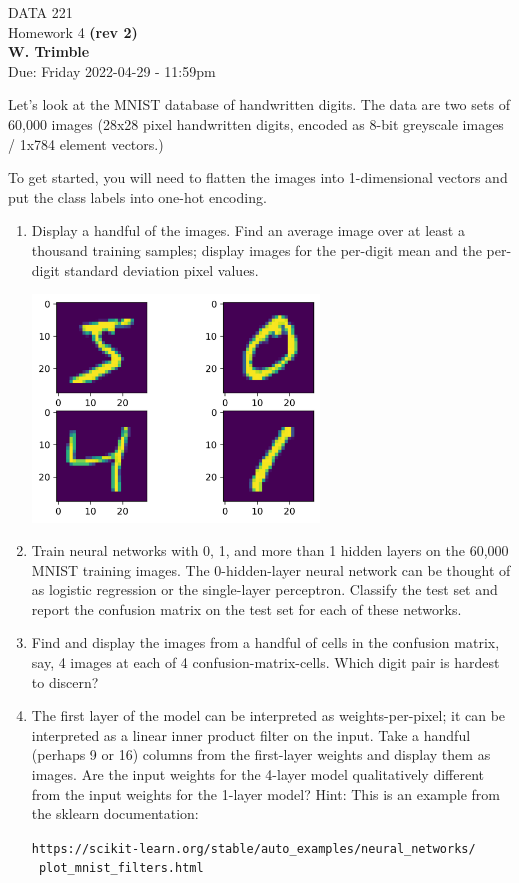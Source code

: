 \documentclass[12pt]{book}
\theoremstyle{definition}
\begin{document}
\begin{center}
{\Large DATA 221 \\  Homework 4  \textbf{(rev 2)}}\\
\textbf{W. Trimble}\\ %
Due: Friday 2022-04-29  - 11:59pm
\end{center}

\vspace{0.2 cm}

Let's look at the MNIST database of handwritten digits.  The data are two sets of 60,000 images (28x28 pixel handwritten digits, encoded as 8-bit greyscale images / 1x784 element vectors.)

To get started, you will need to flatten the images into 1-dimensional vectors and put the class labels into one-hot encoding.

\begin{enumerate}
\item
Display a handful of the images.  Find an average image over at least a thousand training samples; display images for the per-digit mean and the per-digit standard deviation pixel values.

\includegraphics[width=3in]{MNIST.png}

\item
Train neural networks with 0, 1, and more than 1 hidden layers on the 60,000 MNIST training images.  The 0-hidden-layer neural network can be thought of as logistic regression or the single-layer perceptron.
Classify the test set and report the confusion matrix on the test set for each of these networks.

\item
Find and display the images from a handful of cells in the confusion matrix, say, 4 images at each of 4 confusion-matrix-cells.  Which digit pair is hardest to discern? 

\item 
The first layer of the model can be interpreted as weights-per-pixel; it can be interpreted as a linear inner product filter on the input.   
Take a handful (perhaps 9 or 16) columns from the first-layer weights and display them as images.  Are the input weights for the 4-layer model qualitatively different from the input weights for the 1-layer model?
Hint:  This is an example from the sklearn documentation:

\texttt{https://scikit-learn.org/stable/auto\_examples/neural\_networks/ \
plot\_mnist\_filters.html}

\end{enumerate}
\end{document}
